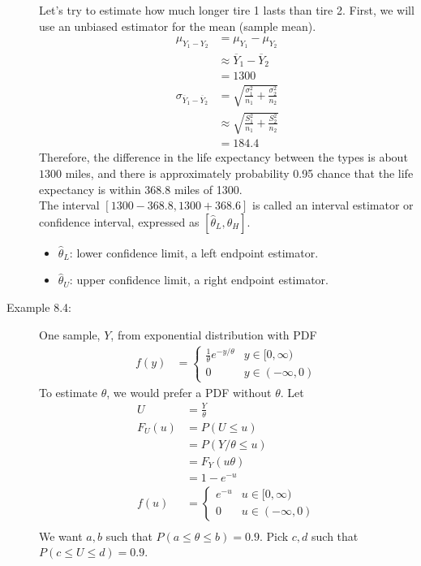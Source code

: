 \documentclass[10pt]{extarticle}
\begin{document}
\begin{description}
      Let's try to estimate how much longer tire 1 lasts than tire 2. First, we will use an unbiased estimator for the mean (sample mean).
      \begin{align*}
        \mu_{Y_1-Y_2} &= \mu_{Y_1} - \mu_{Y_2}\\
                      &\approx \overline{Y}_1 - \overline{Y}_2\\
                      &= 1300\\
        \sigma_{\overline{Y}_1-\overline{Y}_2} &= \sqrt{\frac{\sigma_1^2}{n_1} + \frac{\sigma_2^2}{n_2}} \tag*{Table 8.1}\\
                                               &\approx \sqrt{\frac{S_1^2}{n_1} + \frac{S_2^2}{n_2}} \tag*{$S^2$ an unbiased estimator for $\sigma^2$}\\
                                               &= 184.4
      \end{align*}
      Therefore, the difference in the life expectancy between the types is about $1300$ miles, and there is approximately probability 0.95 chance that the life expectancy is within 368.8 miles of 1300.\\

      The interval $[1300-368.8,1300+368.6]$ is called an interval estimator or confidence interval, expressed as $[\hat{\theta}_{L},\hat{\theta}_{H}]$.
      \begin{itemize}
        \item $\hat{\theta}_{L}$: lower confidence limit, a left endpoint estimator.
        \item $\hat{\theta}_{U}$: upper confidence limit, a right endpoint estimator.
      \end{itemize}
    \item[Example 8.4:] One sample, $Y$, from exponential distribution with PDF
      \begin{align*}
        f(y) &= \begin{cases}
          \frac{1}{\theta}e^{-y/\theta}& y\in[0,\infty)\\
          0 & y\in(-\infty,0)
        \end{cases}
      \end{align*}
      To estimate $\theta$, we would prefer a PDF without $\theta$. Let
      \begin{align*}
        U &= \frac{Y}{\theta}\tag*{pivotal quantity}\\
          F_{U}(u) &= P(U\leq u)\\
               &= P(Y/\theta \leq u)\\
               &= F_{Y}(u\theta)\\
               &= 1-e^{-u}\\
        f(u) &= \begin{cases}
          e^{-u}& u\in[0,\infty)\\
          0 & u\in(-\infty,0)
        \end{cases}\\
      \end{align*}
      We want $a,b$ such that $P(a\leq\theta\leq b) = 0.9$. Pick $c,d$ such that $P(c\leq U \leq d) = 0.9$.\\


\end{description}
\end{document}
